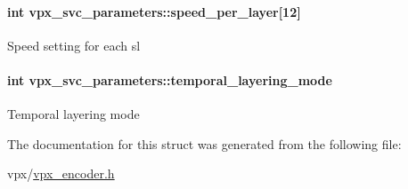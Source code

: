 \paragraph[{\texorpdfstring{speed\+\_\+per\+\_\+layer}{speed_per_layer}}]{\setlength{\rightskip}{0pt plus 5cm}int vpx\+\_\+svc\+\_\+parameters\+::speed\+\_\+per\+\_\+layer\mbox{[}12\mbox{]}}\hypertarget{structvpx__svc__parameters_a964f63808fb21ead3773d01184ee010c}{}\label{structvpx__svc__parameters_a964f63808fb21ead3773d01184ee010c}
Speed setting for each sl 
\paragraph[{\texorpdfstring{temporal\+\_\+layering\+\_\+mode}{temporal_layering_mode}}]{\setlength{\rightskip}{0pt plus 5cm}int vpx\+\_\+svc\+\_\+parameters\+::temporal\+\_\+layering\+\_\+mode}\hypertarget{structvpx__svc__parameters_adf8ca5b4011bf6c0d6248bafc4177190}{}\label{structvpx__svc__parameters_adf8ca5b4011bf6c0d6248bafc4177190}
Temporal layering mode 

The documentation for this struct was generated from the following file\+:\begin{DoxyCompactItemize}
\item 
vpx/\hyperlink{vpx__encoder_8h}{vpx\+\_\+encoder.\+h}\end{DoxyCompactItemize}
